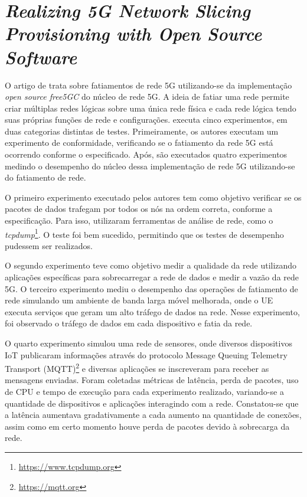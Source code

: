\section{\textit{Realizing 5G Network Slicing Provisioning with Open Source Software}}

O artigo de \cite{Lee2021} trata sobre fatiamentos de rede 5G utilizando-se da implementação \textit{open source free5GC} do núcleo de rede 5G.
A ideia de fatiar uma rede permite criar múltiplas redes lógicas sobre uma única rede física e cada rede lógica tendo suas próprias funções de rede e configurações.
\cite{Lee2021} executa cinco experimentos, em duas categorias distintas de testes. Primeiramente, os autores executam um experimento de conformidade, verificando se o fatiamento da rede 5G está ocorrendo conforme o especificado. Após, são executados quatro experimentos medindo o desempenho do núcleo dessa implementação de rede 5G utilizando-se do fatiamento de rede.

O primeiro experimento executado pelos autores tem como objetivo verificar se os pacotes de dados trafegam por todos os nós na ordem correta, conforme a especificação.
Para isso, utilizaram ferramentas de análise de rede, como o \textit{tcpdump}\footnote{\url{https://www.tcpdump.org}}.
O teste foi bem sucedido, permitindo que os testes de desempenho pudessem ser realizados.

O segundo experimento teve como objetivo medir a qualidade da rede utilizando aplicações específicas para sobrecarregar a rede de dados e medir a vazão da rede 5G.
O terceiro experimento mediu o desempenho das operações de fatiamento de rede simulando um ambiente de banda larga móvel melhorada, onde o UE executa serviços que geram um alto tráfego de dados na rede.
Nesse experimento, foi observado o tráfego de dados em cada dispositivo e fatia da rede.

O quarto experimento simulou uma rede de sensores, onde diversos dispositivos IoT publicaram informações através do protocolo Message Queuing Telemetry Transport (MQTT)\footnote{\url{https://mqtt.org}} e diversas aplicações se inscreveram para receber as mensagens enviadas.
Foram coletadas métricas de latência, perda de pacotes, uso de CPU e tempo de execução para cada experimento realizado, variando-se a quantidade de dispositivos e aplicações interagindo com a rede.
Constatou-se que a latência aumentava gradativamente a cada aumento na quantidade de conexões, assim como em certo momento houve perda de pacotes devido à sobrecarga da rede.

